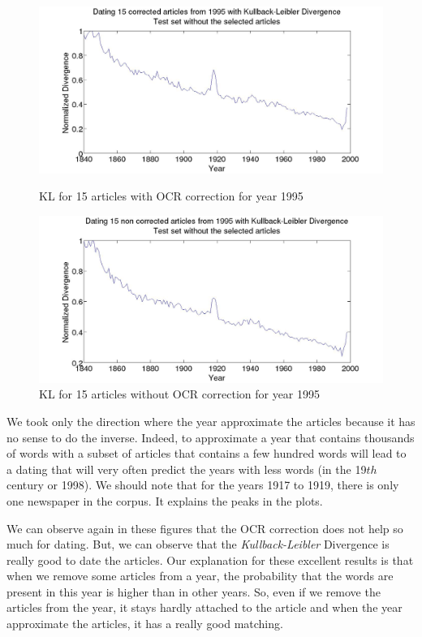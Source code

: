 \begin{figure}[h!]
    \begin{minipage}[b]{0.48\linewidth}
        \includegraphics[scale=0.15]{Pictures/date_articles/kullback_leibler/15articles_1995_KL_years_simulate_articles_corrected_without_articles.jpg}
        \caption{KL for 15 articles with OCR correction for year 1995}
        \label{ArticleKL-C1995}
    \end{minipage}\hfill
    \begin{minipage}[b]{0.5\linewidth}
        \includegraphics[scale=0.15]{Pictures/date_articles/kullback_leibler/15articles_1995_KL_years_simulate_articles_without_correction_without_articles.jpg}
        \caption{KL for 15 articles without OCR correction for year 1995}
        \label{ArticleKL-N1995}
    \end{minipage}\hfill
\end{figure}

We took only the direction where the year approximate the articles because it has no sense to do the inverse. Indeed, to approximate a year that contains thousands of words with a subset of articles that contains a few hundred words will lead to a dating that will very often predict the years with less words (in the 19$th$ century or 1998). We should note that for the years 1917 to 1919, there is only one newspaper in the corpus. It explains the peaks in the plots.

We can observe again in these figures that the OCR correction does not help so much for dating. But, we can observe that the \emph{Kullback-Leibler} Divergence is really good to date the articles. Our explanation for these excellent results is that when we remove some articles from a year, the probability that the words are present in this year is higher than in other years. So, even if we remove the articles from the year, it stays hardly attached to the article and when the year approximate the articles, it has a really good matching.
